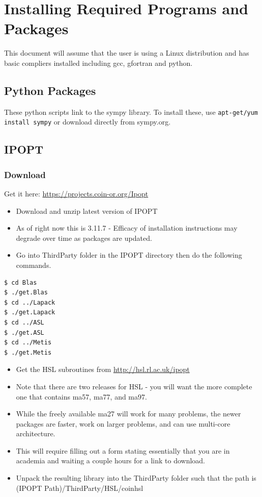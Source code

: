 \documentclass[11pt]{article}
\begin{document}
\section{Installing Required Programs and Packages}
This document will assume that the user is using a Linux distribution and has basic compliers installed including gcc, gfortran and python.
\subsection{Python Packages}
These python scripts link to the sympy library.  To install these, use \texttt{apt-get/yum install sympy} or download directly from sympy.org.
\subsection{IPOPT}
\subsubsection*{Download}
Get it here: \url{https://projects.coin-or.org/Ipopt}
\begin{itemize}
\item Download and unzip latest version of IPOPT 
\item As of right now this is 3.11.7 - Efficacy of installation instructions may degrade over time as packages are updated.
\item Go into ThirdParty folder in the IPOPT directory then do the following commands.
\end{itemize}
\begin{verbatim}
$ cd Blas
$ ./get.Blas
$ cd ../Lapack
$ ./get.Lapack
$ cd ../ASL
$ ./get.ASL
$ cd ../Metis
$ ./get.Metis
\end{verbatim}
\begin{itemize}
\item Get the HSL subroutines from \url{http://hsl.rl.ac.uk/ipopt}
\item Note that there are two releases for HSL - you will want the more complete one that contains ma57, ma77, and ma97. 
\item While the freely available ma27 will work for many problems, the newer packages are faster, work on larger problems, and can use multi-core architecture.
\item This will require filling out a form stating essentially that you are in academia and waiting a couple hours for a link to download.
\item Unpack the resulting library into the ThirdParty folder such that the path is (IPOPT Path)/ThirdParty/HSL/coinhsl
\end{itemize}
\end{document}
